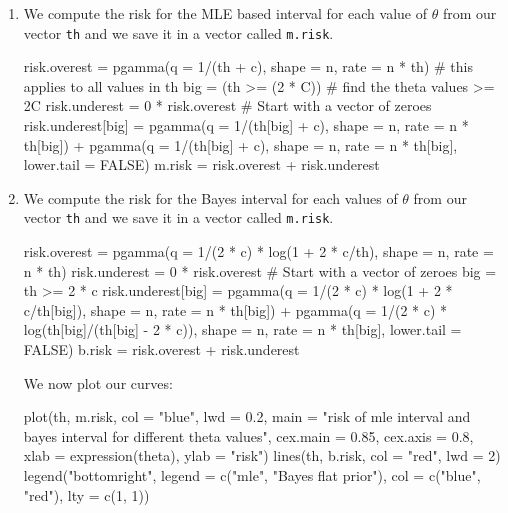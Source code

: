 \documentclass[12pt, a4paper]{article}\usepackage[]{graphicx}\usepackage[]{color}
\begin{document}
\begin{enumerate}[label={\bfseries\arabic*}]
\begin{Schunk}
{}

\end{Schunk}
\item We compute the risk for the MLE based interval for each value of $\theta$ from our vector \verb+th+ and we save it in a vector called \verb+m.risk+. 

\begin{Schunk}
\begin{Sinput}
risk.overest = pgamma(q = 1/(th + c), shape = n, rate = n * th)  # this applies to all values in th
big = (th >= (2 * C))  # find the theta values >= 2C
risk.underest = 0 * risk.overest  # Start with a vector of zeroes
risk.underest[big] = pgamma(q = 1/(th[big] + c), shape = n, rate = n * th[big]) + pgamma(q = 1/(th[big] +
    c), shape = n, rate = n * th[big], lower.tail = FALSE)
m.risk = risk.overest + risk.underest
\end{Sinput}
\end{Schunk}
\item We compute the risk for the Bayes interval for each values of $\theta$ from our vector \verb+th+ and we save it in a vector called \verb+m.risk+. 
\begin{Schunk}
\begin{Sinput}
risk.overest = pgamma(q = 1/(2 * c) * log(1 + 2 * c/th), shape = n, rate = n * th)
risk.underest = 0 * risk.overest  # Start with a vector of zeroes
big = th >= 2 * c
risk.underest[big] = pgamma(q = 1/(2 * c) * log(1 + 2 * c/th[big]), shape = n, rate = n * th[big]) +
    pgamma(q = 1/(2 * c) * log(th[big]/(th[big] - 2 * c)), shape = n, rate = n * th[big], lower.tail = FALSE)
b.risk = risk.overest + risk.underest
\end{Sinput}
\end{Schunk}
We now plot our curves:
\begin{Schunk}
\begin{Sinput}
plot(th, m.risk, col = "blue", lwd = 0.2, main = "risk of mle interval and bayes interval for different theta values",
    cex.main = 0.85, cex.axis = 0.8, xlab = expression(theta), ylab = "risk")
lines(th, b.risk, col = "red", lwd = 2)
legend("bottomright", legend = c("mle", "Bayes flat prior"), col = c("blue", "red"), lty = c(1, 1))
\end{Sinput}



\end{Schunk}
\end{enumerate}
\end{document}
